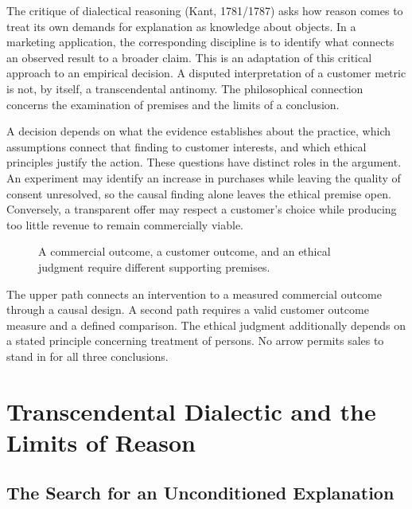 The critique of dialectical reasoning (Kant, 1781/1787) asks how reason
comes to treat its own demands for explanation as knowledge about
objects. In a marketing application, the corresponding discipline is to
identify what connects an observed result to a broader claim. This is an
adaptation of this critical approach to an empirical decision. A
disputed interpretation of a customer metric is not, by itself, a
transcendental antinomy. The philosophical connection concerns the
examination of premises and the limits of a conclusion.

A decision depends on what the evidence establishes about the practice,
which assumptions connect that finding to customer interests, and which
ethical principles justify the action. These questions have distinct
roles in the argument. An experiment may identify an increase in
purchases while leaving the quality of consent unresolved, so the causal
finding alone leaves the ethical premise open. Conversely, a transparent
offer may respect a customer's choice while producing too little revenue
to remain commercially viable.

\begin{figure}[htbp]
\centering

\caption{A commercial outcome, a customer outcome, and an ethical judgment require different supporting premises.}\label{fig:M09_claim_scope}
\end{figure}

The upper path connects an intervention to a measured commercial outcome
through a causal design. A second path requires a valid customer outcome
measure and a defined comparison. The ethical judgment additionally
depends on a stated principle concerning treatment of persons. No arrow
permits sales to stand in for all three conclusions.


\hypertarget{M09-transcendental-dialectic-and-the-limits-of-reason}{%
\section{Transcendental Dialectic and the Limits of
Reason}\label{M09-transcendental-dialectic-and-the-limits-of-reason}}

\noindent \hypertarget{M09-the-search-for-an-unconditioned-explanation}{%
\subsection{The Search for an Unconditioned
Explanation}\label{M09-the-search-for-an-unconditioned-explanation}}

